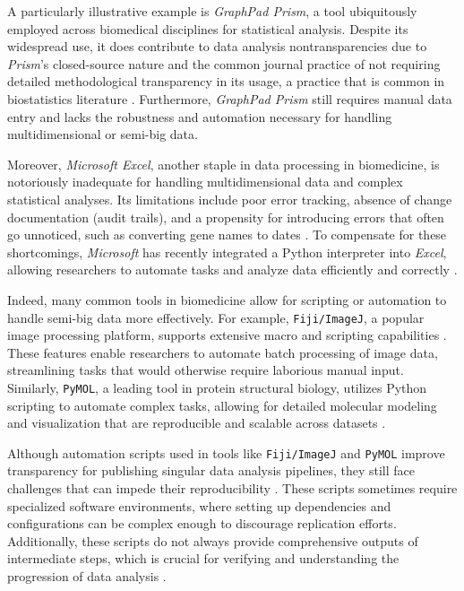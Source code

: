 A particularly illustrative example is \textit{GraphPad Prism}, a tool
ubiquitously employed across biomedical disciplines for statistical analysis.
Despite its widespread use, it does contribute to data analysis
nontransparencies due to \textit{Prism}'s closed-source nature and the common
journal practice of not requiring detailed methodological transparency in its
usage, a practice that is common in biostatistics literature
\cite{gosselinInsufficientTransparencyStatistical2021,
localioStatisticalCodeSupport2018}. Furthermore, \textit{GraphPad Prism} still
requires manual data entry and lacks the robustness and automation necessary for
handling multidimensional or semi-big data.

Moreover, \textit{Microsoft Excel}, another staple in data processing in
biomedicine, is notoriously inadequate for handling multidimensional data and
complex statistical analyses. Its limitations include poor error tracking,
absence of change documentation (audit trails), and a propensity for introducing
errors that often go unnoticed, such as converting gene names to dates
\cite{ziemannGeneNameErrors2016}. To compensate for these shortcomings,
\textit{Microsoft} has recently integrated a Python interpreter into
\textit{Excel}, allowing researchers to automate tasks and analyze data
efficiently and correctly \cite{microsoftexcelAnnouncingPythonExcel2023}.

Indeed, many common tools in biomedicine allow for scripting or automation to
handle semi-big data more effectively. For example, \texttt{Fiji/ImageJ}, a
popular image processing platform, supports extensive macro and scripting
capabilities \cite{ruedenImageJ2ImageJNext2017}. These features enable researchers to automate batch processing of
image data, streamlining tasks that would otherwise require laborious manual
input. Similarly, \texttt{PyMOL}, a leading tool in protein structural biology,
utilizes Python scripting to automate complex tasks, allowing for detailed
molecular modeling and visualization that are reproducible and scalable across
datasets \cite{PyMOLPymolOrg,rigsbyUsingPyMOLApplication2016}.

Although automation scripts used in tools like \texttt{Fiji/ImageJ} and
\texttt{PyMOL} improve transparency for publishing singular data analysis
pipelines, they still face challenges that can impede their reproducibility
\cite{pengReproducibleResearchComputational2011, sandveTenSimpleRules2013}.
These scripts sometimes require specialized software environments, where setting
up dependencies and configurations can be complex enough to discourage
replication efforts. Additionally, these scripts do not always provide
comprehensive outputs of intermediate steps, which is crucial for verifying and
understanding the progression of data analysis \cite{sandveTenSimpleRules2013}.

